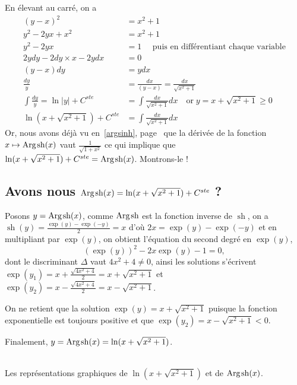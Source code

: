 \documentclass[a4paper,landscape,17pt]{extreport} %
\renewcommand{\sinh}{\mathop{\mathrm{sh}}}
\renewcommand{\arg}{\mathop{\mathrm{Arg}}}
\begin{document}
En élevant au carré, on a 
\begin{align*}
(y-x)^2 & = x^2 + 1 \\
y^2 - 2yx + x^2 & = x^2 + 1 \\
y^2 - 2yx  & = 1 \quad \textrm{ puis en différentiant chaque variable} \\
2ydy - 2dy \times x - 2ydx & = 0 \\
(y-x)dy & = ydx \\
\frac{dy}{y} & = \frac{dx}{(y-x)} = \frac{dx}{\sqrt{x^2+1} } \\
\int \frac{dy}{y} = \ln|y| + C^{ste} & = \int \frac{dx}{\sqrt{x^2+1} } dx \quad \textrm{or} \; y = x + \sqrt{x^2+1}  \geqslant 0 \\
\ln(x + \sqrt{x^2+1}) + C^{ste} & = \int \frac{dx}{\sqrt{x^2+1} } dx  
\end{align*}
Or, nous avons déjà vu en~\ref{argsinh}, page~\pageref{argsinh} que la dérivée de la fonction  $x \mapsto \arg\mspace{-1mu}\sinh(x)$  vaut $ \frac{1}{ \sqrt{1+x^2}}$ ce qui implique que $\ln(x + \sqrt{x^2+1}) + C^{ste} = \arg\mspace{-1mu}\sinh\nolimits(x) $. Montrons-le !

\subsection{Avons nous $\arg\mspace{-1mu}\sinh\nolimits(x) = \ln(x + \sqrt{x^2+1}) + C^{ste} $ ?}

Posons $ y = \arg\mspace{-1mu}\sinh\nolimits(x) $, comme $ \arg\mspace{-1mu}\sinh\nolimits $ est la fonction inverse de $\sinh$, on a $\sinh(y) = \frac{\exp(y) - \exp(-y)}{2} = x$ d'où $2x = \exp(y) - \exp(-y) $ et en multipliant par $\exp(y)$, on obtient l'équation du second degré en $\exp(y)$,
\begin{equation}
\left(\exp(y) \right)^2 - 2x \exp(y) -1 = 0, 
\end{equation}
dont le discriminant $\Delta$ vaut $4x^2 + 4 \neq 0$, ainsi les solutions s'écrivent $ \exp(y_1) = x + \frac{\sqrt{4x^2 + 4}}{2} = x + \sqrt{x^2+1}$ et $ \exp(y_2) = x - \frac{\sqrt{4x^2 + 4}}{2} = x - \sqrt{x^2+1}$. 

On ne retient que la solution $ \exp(y) = x + \sqrt{x^2+1}$ puisque la fonction exponentielle est toujours positive et que $ \exp(y_2) = x - \sqrt{x^2+1} < 0 $.

Finalement, $y = \arg\mspace{-1mu}\sinh\nolimits(x) = \ln(x + \sqrt{x^2+1})$.


\begin{center}
 \\
Les représentations graphiques de $\ln(x + \sqrt{x^2+1})$ et de $\arg\mspace{-1mu}\sinh\nolimits(x)$.
\end{center}
\end{document}
